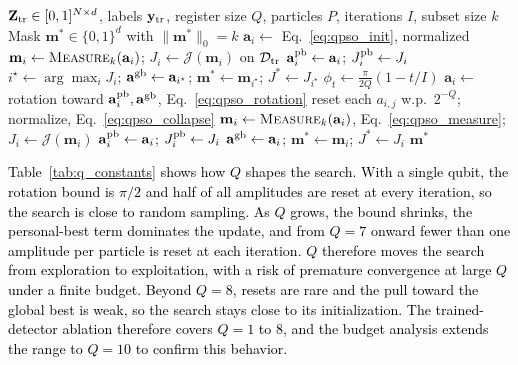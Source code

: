 \documentclass[conference]{IEEEtran}
\begin{document}
\begin{algorithm}[!t]
\caption{\textcolor{black}{Variable-qubit QPSO feature
selection. Steps commented with Q are the only ones that depend on
the register size.}}
\label{alg:qpso}
\small
\begin{algorithmic}[1]
\Require $\mathbf{Z}_{\rm tr}\in[0,1]^{N\times d}$, labels $\mathbf{y}_{\rm tr}$, register size $Q$, particles $P$, iterations $I$, subset size $k$
\Ensure Mask $\mathbf{m}^{*}\in\{0,1\}^{d}$ with $\|\mathbf{m}^{*}\|_0=k$
  \State $\mathbf{a}_i\gets$ Eq.~\eqref{eq:qpso_init}, normalized 
  \State $\mathbf{m}_i\gets\textsc{Measure}_k(\mathbf{a}_i)$; $J_i\gets\mathcal{J}(\mathbf{m}_i)$ on $\mathcal{D}_{\rm tr}$
  \State $\mathbf{a}_i^{\rm pb}\gets\mathbf{a}_i$; $J_i^{\rm pb}\gets J_i$
\EndFor
\State $i^{\star}\gets\arg\max_i J_i$; $\mathbf{a}^{\rm gb}\gets\mathbf{a}_{i^{\star}}$; $\mathbf{m}^{*}\gets\mathbf{m}_{i^{\star}}$; $J^{*}\gets J_{i^{\star}}$
  \State $\phi_t\gets\frac{\pi}{2Q}(1-t/I)$ 
    \State $\mathbf{a}_i\gets$ rotation toward $\mathbf{a}_i^{\rm pb},\mathbf{a}^{\rm gb}$, Eq.~\eqref{eq:qpso_rotation}
    \State reset each $a_{i,j}$ w.p.\ $2^{-Q}$; normalize, Eq.~\eqref{eq:qpso_collapse} 
    \State $\mathbf{m}_i\gets\textsc{Measure}_k(\mathbf{a}_i)$, Eq.~\eqref{eq:qpso_measure}; $J_i\gets\mathcal{J}(\mathbf{m}_i)$
      \State $\mathbf{a}_i^{\rm pb}\gets\mathbf{a}_i$; $J_i^{\rm pb}\gets J_i$
    \EndIf
      \State $\mathbf{a}^{\rm gb}\gets\mathbf{a}_i$; $\mathbf{m}^{*}\gets\mathbf{m}_i$; $J^{*}\gets J_i$
    \EndIf
  \EndFor
\EndFor
\State \Return $\mathbf{m}^{*}$ 
\end{algorithmic}
\end{algorithm}

\textcolor{black}{Table~\ref{tab:q_constants} shows
how $Q$ shapes the search. With a single qubit, the rotation bound is
$\pi/2$ and half of all amplitudes are reset at every iteration, so
the search is close to random sampling. As $Q$ grows, the bound
shrinks, the personal-best term dominates the update, and from $Q=7$
onward fewer than one amplitude per particle is reset at each
iteration. $Q$ therefore
moves the search from exploration to exploitation, with a risk of
premature convergence at large $Q$ under a finite budget. Beyond
$Q=8$, resets are rare and the pull toward the global best is weak,
so the search stays close to its initialization. The trained-detector
ablation therefore covers $Q=1$ to $8$, and the budget analysis
extends the range to $Q=10$ to confirm this behavior.}
\end{document}
